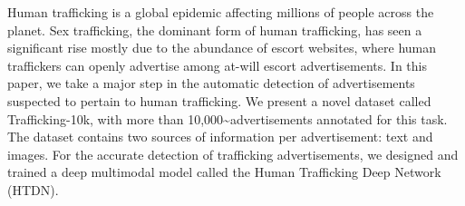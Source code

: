 Human trafficking is a global epidemic affecting millions of people across the planet. Sex trafficking, the dominant form of human trafficking, has seen a significant rise mostly due to the abundance of escort websites, where human traffickers can openly advertise among at-will escort advertisements. In this paper, we take a major step in the automatic detection of advertisements suspected to pertain to human trafficking. We present a novel dataset called Trafficking-10k, with more than 10,000{\textasciitilde}advertisements annotated for this task. The dataset contains two sources of information per advertisement: text and images. For the accurate detection of trafficking advertisements, we designed and trained a deep multimodal model called the Human Trafficking Deep Network (HTDN).
